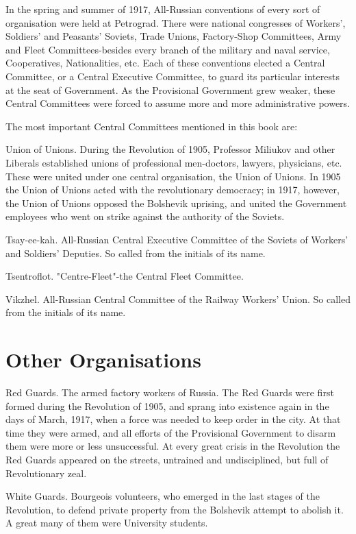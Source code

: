\begin{enumerate}
In the spring and summer of 1917, All-Russian conventions of every sort of organisation were held at Petrograd. There were national congresses of Workers', Soldiers' and Peasants' Soviets, Trade Unions, Factory-Shop Committees, Army and Fleet Committees-besides every branch of the military and naval service, Cooperatives, Nationalities, etc. Each of these conventions elected a Central Committee, or a Central Executive Committee, to guard its particular interests at the seat of Government. As the Provisional Government grew weaker, these Central Committees were forced to assume more and more administrative powers.

The most important Central Committees mentioned in this book are:

Union of Unions. During the Revolution of 1905, Professor Miliukov and other Liberals established unions of professional men-doctors, lawyers, physicians, etc. These were united under one central organisation, the Union of Unions. In 1905 the Union of Unions acted with the revolutionary democracy; in 1917, however, the Union of Unions opposed the Bolshevik uprising, and united the Government employees who went on strike against the authority of the Soviets.

Tsay-ee-kah. All-Russian Central Executive Committee of the Soviets of Workers' and Soldiers' Deputies. So called from the initials of its name.

Tsentroflot. "Centre-Fleet"-the Central Fleet Committee.

Vikzhel. All-Russian Central Committee of the Railway Workers' Union. So called from the initials of its name.

\section*{Other Organisations}

Red Guards. The armed factory workers of Russia. The Red Guards were first formed during the Revolution of 1905, and sprang into existence again in the days of March, 1917, when a force was needed to keep order in the city. At that time they were armed, and all efforts of the Provisional Government to disarm them were more or less unsuccessful. At every great crisis in the Revolution the Red Guards appeared on the streets, untrained and undisciplined, but full of Revolutionary zeal.

White Guards. Bourgeois volunteers, who emerged in the last stages of the Revolution, to defend private property from the Bolshevik attempt to abolish it. A great many of them were University students.


\end{enumerate}
